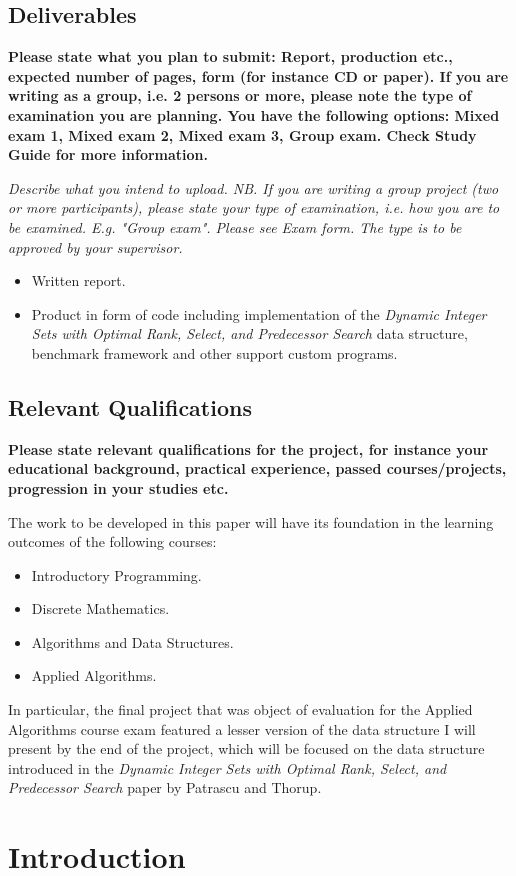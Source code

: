\subsection{Deliverables}
\textbf{Please state what you plan to submit: Report, production etc., expected number of pages, form (for instance CD or paper). If you are writing as a group, i.e. 2 persons or more, please note the type of examination you are planning. You have the following options: Mixed exam 1, Mixed exam 2, Mixed exam 3, Group exam. Check Study Guide for more information.}

\textit{Describe what you intend to upload.
NB. If you are writing a group project (two or more participants), please state your type of examination, i.e. how you are to be examined. E.g. "Group exam". Please see Exam form. The type is to be approved by your supervisor.}

\begin{itemize}
    \item Written report.
    \item Product in form of code including implementation of the \textit{Dynamic Integer Sets with Optimal \textit{Rank}, \textit{Select}, and Predecessor Search} data structure, benchmark framework and other support custom programs.
\end{itemize}


\subsection{Relevant Qualifications}
\textbf{Please state relevant qualifications for the project, for instance your educational background, practical experience, passed courses/projects, progression in your studies etc.}

The work to be developed in this paper will have its foundation in the learning outcomes of the following courses:
\begin{itemize}
    \item Introductory Programming.
    \item Discrete Mathematics.
    \item Algorithms and Data Structures.
    \item Applied Algorithms.
\end{itemize}
In particular, the final project that was object of evaluation for the Applied Algorithms course exam featured a lesser version of the data structure I will present by the end of the project, which will be focused on the data structure introduced in the \textit{Dynamic Integer Sets with Optimal \textit{Rank}, \textit{Select}, and Predecessor Search} paper by Patrascu and Thorup.

\section{Introduction}